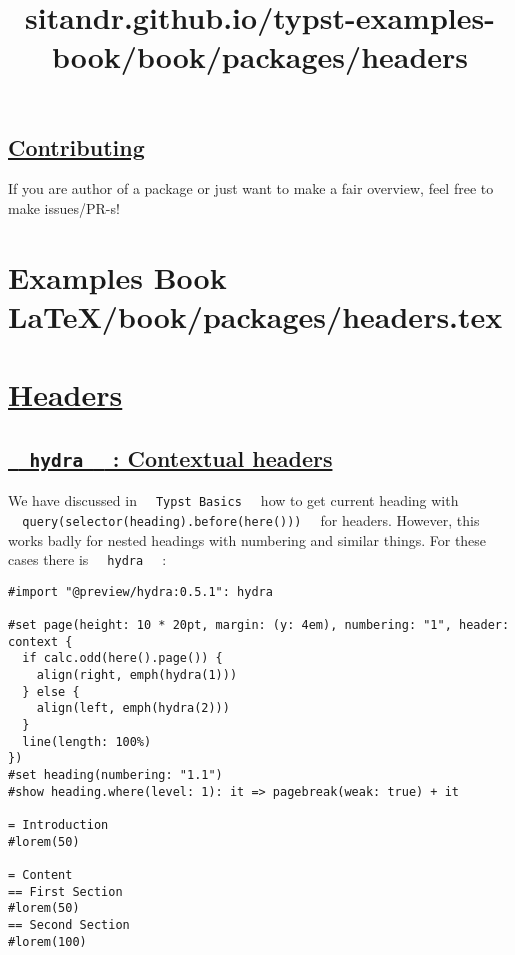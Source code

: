 \pandocbounded{}

\subsection{\texorpdfstring{\hyperref[contributing]{Contributing}}{Contributing}}\label{contributing}

If you are author of a package or just want to make a fair overview,
feel free to make issues/PR-s!


\section{Examples Book LaTeX/book/packages/headers.tex}
\title{sitandr.github.io/typst-examples-book/book/packages/headers}

\section{\texorpdfstring{\hyperref[headers]{Headers}}{Headers}}\label{headers}

\subsection{\texorpdfstring{\hyperref[hydra-contextual-headers]{\texttt{\ }{\texttt{\ hydra\ }}\texttt{\ }
: Contextual
headers}}{  hydra   : Contextual headers}}\label{hydra-contextual-headers}

We have discussed in \texttt{\ }{\texttt{\ Typst\ Basics\ }}\texttt{\ }
how to get current heading with
\texttt{\ }{\texttt{\ query(selector(heading).before(here()))\ }}\texttt{\ }
for headers. However, this works badly for nested headings with
numbering and similar things. For these cases there is
\texttt{\ }{\texttt{\ hydra\ }}\texttt{\ } :

\begin{verbatim}
#import "@preview/hydra:0.5.1": hydra

#set page(height: 10 * 20pt, margin: (y: 4em), numbering: "1", header: context {
  if calc.odd(here().page()) {
    align(right, emph(hydra(1)))
  } else {
    align(left, emph(hydra(2)))
  }
  line(length: 100%)
})
#set heading(numbering: "1.1")
#show heading.where(level: 1): it => pagebreak(weak: true) + it

= Introduction
#lorem(50)

= Content
== First Section
#lorem(50)
== Second Section
#lorem(100)
\end{verbatim}

